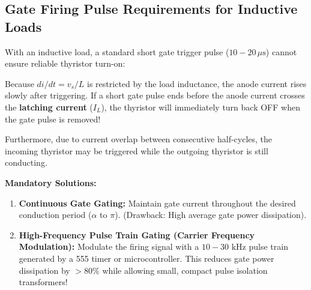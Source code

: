 \documentclass[11pt,a4paper]{article}
\begin{document}
\subsection{Gate Firing Pulse Requirements for Inductive Loads}
With an inductive load, a standard short gate trigger pulse ($10 - 20\,\mu\text{s}$) cannot ensure reliable thyristor turn-on:
\begin{conceptbox}
Because $di/dt = v_s/L$ is restricted by the load inductance, the anode current rises slowly after triggering. If a short gate pulse ends before the anode current crosses the \textbf{latching current} ($I_L$), the thyristor will immediately turn back OFF when the gate pulse is removed!

Furthermore, due to current overlap between consecutive half-cycles, the incoming thyristor may be triggered while the outgoing thyristor is still conducting.

\textbf{Mandatory Solutions:}
\begin{enumerate}
  \item \textbf{Continuous Gate Gating:} Maintain gate current throughout the desired conduction period ($\alpha$ to $\pi$). (Drawback: High average gate power dissipation).
  \item \textbf{High-Frequency Pulse Train Gating (Carrier Frequency Modulation):} Modulate the firing signal with a $10 - 30\text{ kHz}$ pulse train generated by a 555 timer or microcontroller. This reduces gate power dissipation by $>80\%$ while allowing small, compact pulse isolation transformers!
\end{enumerate}
\end{conceptbox}
\end{document}
